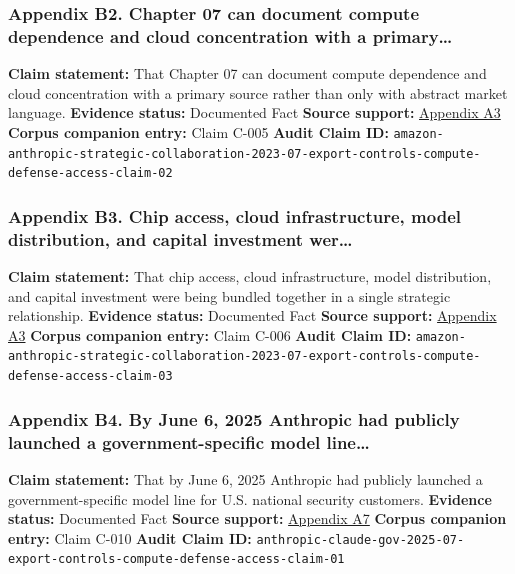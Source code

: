 \documentclass[
  american,
  11pt,
  letterpaper,
]{article}
\begin{document}
\subsubsection{Appendix B2. Chapter 07 can document compute dependence
and cloud concentration with a
primary\ldots{}}\label{ch-07-appendix-b2-chapter-07-can-document-compute-dependence-and-cloud-concentration-with-a-primary}

\textbf{Claim statement:} That Chapter 07 can document compute
dependence and cloud concentration with a primary source rather than
only with abstract market language. \textbf{Evidence status:} Documented
Fact \textbf{Source support:}
\hyperref[ch-07-appendix-a3-amazon-and-anthropic-announce-strategic-collaboration-to-advance-generative-ai]{Appendix
A3} \textbf{Corpus companion entry:} Claim C-005 \textbf{Audit Claim
ID:}
\texttt{amazon-anthropic-strategic-collaboration-2023-07-export-controls-compute-defense-access-claim-02}

\subsubsection{Appendix B3. Chip access, cloud infrastructure, model
distribution, and capital investment
wer\ldots{}}\label{ch-07-appendix-b3-chip-access-cloud-infrastructure-model-distribution-and-capital-investment-wer}

\textbf{Claim statement:} That chip access, cloud infrastructure, model
distribution, and capital investment were being bundled together in a
single strategic relationship. \textbf{Evidence status:} Documented Fact
\textbf{Source support:}
\hyperref[ch-07-appendix-a3-amazon-and-anthropic-announce-strategic-collaboration-to-advance-generative-ai]{Appendix
A3} \textbf{Corpus companion entry:} Claim C-006 \textbf{Audit Claim
ID:}
\texttt{amazon-anthropic-strategic-collaboration-2023-07-export-controls-compute-defense-access-claim-03}

\subsubsection{Appendix B4. By June 6, 2025 Anthropic had publicly
launched a government-specific model
line\ldots{}}\label{ch-07-appendix-b4-by-june-6-2025-anthropic-had-publicly-launched-a-government-specific-model-line}

\textbf{Claim statement:} That by June 6, 2025 Anthropic had publicly
launched a government-specific model line for U.S. national security
customers. \textbf{Evidence status:} Documented Fact \textbf{Source
support:}
\hyperref[ch-07-appendix-a7-claude-gov-models-for-u-s-national-security-customers]{Appendix
A7} \textbf{Corpus companion entry:} Claim C-010 \textbf{Audit Claim
ID:}
\texttt{anthropic-claude-gov-2025-07-export-controls-compute-defense-access-claim-01}
\end{document}
